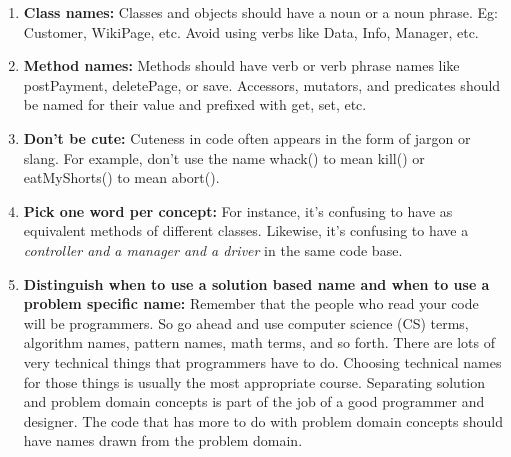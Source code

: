 \documentclass[12pt]{article}
\begin{document}
\begin{enumerate}
\begin{itemize}
    \end{itemize}
    \item \textbf{Class names:} Classes and objects should have a noun or a noun phrase. Eg: Customer, WikiPage, etc. Avoid using verbs like Data, Info, Manager, etc.
    
    \item \textbf{Method names: }Methods should have verb or verb phrase names like postPayment, deletePage, or save. Accessors, mutators, and predicates should be named for their value and prefixed with get, set, etc.    
    \item \textbf{Don't be cute: }Cuteness in code often appears in the form of jargon or slang. For example, don’t use the name whack() to mean kill() or eatMyShorts() to mean abort().
    \item \textbf{Pick one word per concept: }For instance, it’s confusing to have  as equivalent methods of different classes. Likewise, it’s confusing to have a \textit{controller and a manager and a driver} in the same code base.
    
    \item \textbf{Distinguish when to use a solution based name and when to use a problem specific name: }Remember that the people who read your code will be programmers. So go ahead and use computer science (CS) terms, algorithm names, pattern names, math terms, and so forth. There are lots of very technical things that programmers have to do. Choosing technical names for those things is usually the most appropriate course. Separating solution and problem domain concepts is part of the job of a good programmer and designer. The code that has more to do with problem domain concepts should have names drawn from the problem domain.
\end{enumerate}
\end{document}
